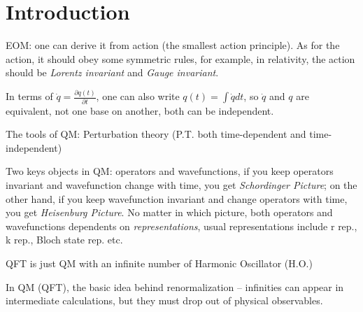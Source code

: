 \chapter{Introduction}

EOM: one can derive it from action (the smallest action principle). As for the action, it should obey some symmetric rules, for example, in relativity, the action should be \emph{Lorentz invariant} and \emph{Gauge invariant}. 

In terms of $\dot{q} = \frac{\partial{q(t)}}{\partial t}$, one can also write $q(t) = \int \dot{q}dt$, so $\dot{q}$ and $q$ are equivalent, not one base on another, both can be independent.

The tools of QM: Perturbation theory (P.T. both time-dependent and time-independent)

Two keys objects in QM: operators and wavefunctions, if you keep operators invariant and wavefunction change with time, you get \emph{Schordinger Picture}; on the other hand, if you keep wavefunction invariant and change operators with time, you get \emph{Heisenburg Picture}. No matter in which picture, both operators and wavefunctions dependents on \emph{representations}, usual representations include r rep., k rep., Bloch state rep. etc.

QFT is just QM with an infinite number of Harmonic Oscillator (H.O.)

In QM (QFT), the basic idea behind renormalization -- infinities can appear in intermediate calculations, but they must drop out of physical observables.

